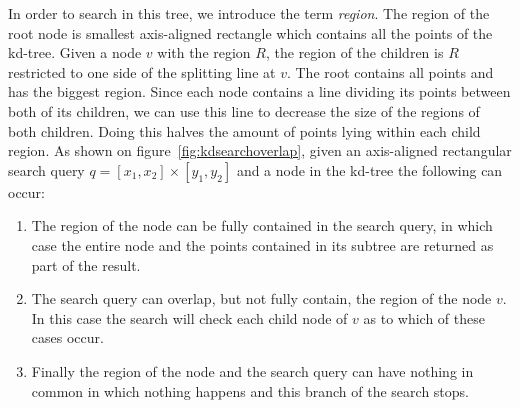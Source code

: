 %
%
%
%
%
%
In order to search in this tree, we introduce the term \emph{region}. The region of the root node is smallest axis-aligned rectangle which contains all the points of the kd-tree. Given a node $v$ with the region $R$, the region of the children is $R$ restricted to one side of the splitting line at $v$. The root contains all points and has the biggest region. Since each node contains a line dividing its points between both of its children, we can use this line to decrease the size of the regions of both children. Doing this halves the amount of points lying within each child region. As shown on figure~\ref{fig:kdsearchoverlap}, given an axis-aligned rectangular search query $q = [x_1, x_2] \times [y_1, y_2]$ and a node in the kd-tree the following can occur:

\begin{enumerate} 
  \item The region of the node can be fully contained in the search query, in which case the entire node and the points contained in its subtree are returned as part of the result. 
  \item The search query can overlap, but not fully contain, the region of the node $v$. In this case the search will check each child node of $v$ as to which of these cases occur.
  \item Finally the region of the node and the search query can have nothing in common in which nothing happens and this branch of the search stops.
\end{enumerate}


